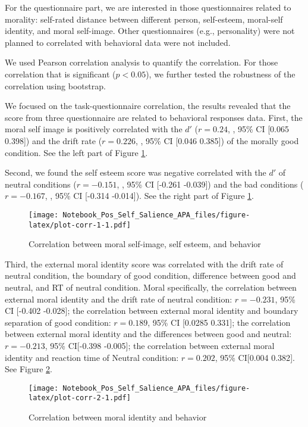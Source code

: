 \documentclass[
  english,
  man]{apa6}
\begin{document}
For the questionnaire part, we are interested in those questionnaires related to morality: self-rated distance between different person, self-esteem, moral-self identity, and moral self-image. Other questionnaires (e.g., personality) were not planned to correlated with behavioral data were not included.

We used Pearson correlation analysis to quantify the correlation. For those correlation that is significant (\(p < 0.05\)), we further tested the robustness of the correlation using bootstrap.

We focused on the task-questionnaire correlation, the results revealed that the score from three questionnaire are related to behavioral responses data.
First, the moral self image is positively correlated with the \(d'\) (\(r = 0.24\), , 95\% CI {[}0.065 0.398{]}) and the drift rate (\(r = 0.226\), , 95\% CI {[}0.046 0.385{]}) of the morally good condition. See the left part of Figure \ref{fig:plot-corr-1}.

Second, we found the self esteem score was negative correlated with the \(d'\) of neutral conditions (\(r = -0.151\), , 95\% CI {[}-0.261 -0.039{]}) and the bad conditions (\(r = -0.167\), , 95\% CI {[}-0.314 -0.014{]}). See the right part of Figure \ref{fig:plot-corr-1}.

\begin{figure}
\centering
\texttt{[image: Notebook\_Pos\_Self\_Salience\_APA\_files/figure-latex/plot-corr-1-1.pdf]}
\caption{\label{fig:plot-corr-1}Correlation between moral self-image, self esteem, and behavior}
\end{figure}

Third, the external moral identity score was correlated with the drift rate of neutral condition, the boundary of good condition, difference between good and neutral, and RT of neutral condition. Moral specifically, the correlation between external moral identity and the drift rate of neutral condition: \(r = -0.231\), 95\% CI {[}-0.402 -0.028{]}; the correlation between external moral identity and boundary separation of good condition: \(r = 0.189\), 95\% CI {[}0.0285 0.331{]}; the correlation between external moral identity and the differences between good and neutral: \(r = -0.213\), 95\% CI{[}-0.398 -0.005{]}; the correlation between external moral identity and reaction time of Neutral condition: \(r = 0.202\), 95\% CI{[}0.004 0.382{]}. See Figure \ref{fig:plot-corr-2}.

\begin{figure}
\centering
\texttt{[image: Notebook\_Pos\_Self\_Salience\_APA\_files/figure-latex/plot-corr-2-1.pdf]}
\caption{\label{fig:plot-corr-2}Correlation between moral identity and behavior}
\end{figure}
\end{document}

